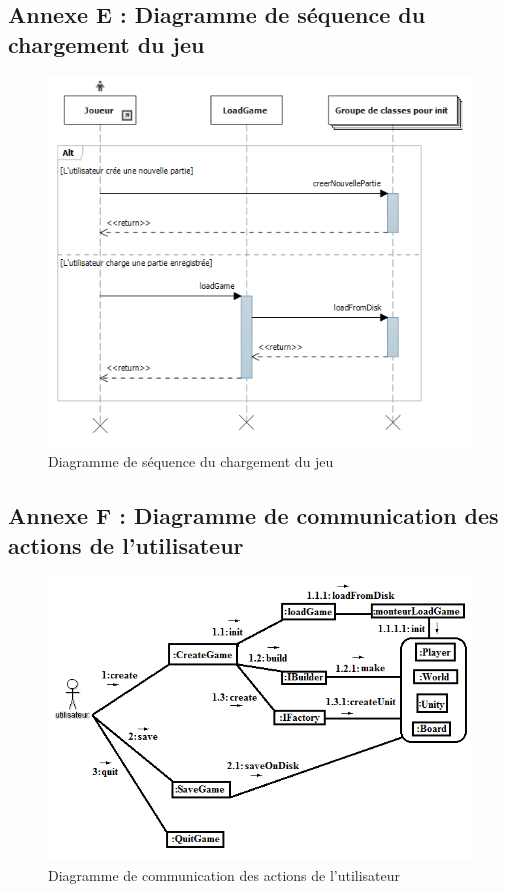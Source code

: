 \subsection{Annexe E : Diagramme de séquence du chargement du jeu}
\begin{figure}[!h]
\centering
\includegraphics[width=1\textwidth]{img/LoadInitDiagram.png}
\caption{Diagramme de séquence du chargement du jeu}
\end{figure}
\clearpage

\subsection{Annexe F : Diagramme de communication des actions de l'utilisateur}
\begin{figure}[!h]
\centering
\includegraphics[width=1\textwidth]{img/com.png}
\caption{Diagramme de communication des actions de l'utilisateur}
\end{figure}
\clearpage

